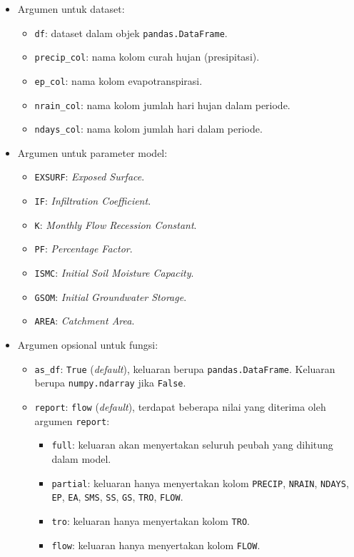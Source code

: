 \documentclass[11pt]{article}
\providecommand{\tightlist}{%
      \setlength{\itemsep}{0pt}\setlength{\parskip}{0pt}}
\begin{document}
\begin{itemize}
\tightlist
\item
  Argumen untuk dataset:

  \begin{itemize}
  \tightlist
  \item
    \texttt{df}: dataset dalam objek \texttt{pandas.DataFrame}.
  \item
    \texttt{precip\_col}: nama kolom curah hujan (presipitasi).
  \item
    \texttt{ep\_col}: nama kolom evapotranspirasi.
  \item
    \texttt{nrain\_col}: nama kolom jumlah hari hujan dalam periode.
  \item
    \texttt{ndays\_col}: nama kolom jumlah hari dalam periode.
  \end{itemize}
\item
  Argumen untuk parameter model:

  \begin{itemize}
  \tightlist
  \item
    \texttt{EXSURF}: \emph{Exposed Surface}.
  \item
    \texttt{IF}: \emph{Infiltration Coefficient}.
  \item
    \texttt{K}: \emph{Monthly Flow Recession Constant}.
  \item
    \texttt{PF}: \emph{Percentage Factor}.
  \item
    \texttt{ISMC}: \emph{Initial Soil Moisture Capacity}.
  \item
    \texttt{GSOM}: \emph{Initial Groundwater Storage}.
  \item
    \texttt{AREA}: \emph{Catchment Area}.
  \end{itemize}
\item
  Argumen opsional untuk fungsi:

  \begin{itemize}
  \tightlist
  \item
    \texttt{as\_df}: \texttt{True} (\emph{default}), keluaran berupa
    \texttt{pandas.DataFrame}. Keluaran berupa \texttt{numpy.ndarray}
    jika \texttt{False}.
  \item
    \texttt{report}: \texttt{\textquotesingle{}flow\textquotesingle{}}
    (\emph{default}), terdapat beberapa nilai yang diterima oleh argumen
    \texttt{report}:

    \begin{itemize}
    \tightlist
    \item
      \texttt{full}: keluaran akan menyertakan seluruh peubah yang
      dihitung dalam model.
    \item
      \texttt{partial}: keluaran hanya menyertakan kolom
      \texttt{PRECIP}, \texttt{NRAIN}, \texttt{NDAYS}, \texttt{EP},
      \texttt{EA}, \texttt{SMS}, \texttt{SS}, \texttt{GS}, \texttt{TRO},
      \texttt{FLOW}.
    \item
      \texttt{tro}: keluaran hanya menyertakan kolom \texttt{TRO}.
    \item
      \texttt{flow}: keluaran hanya menyertakan kolom \texttt{FLOW}.
    \end{itemize}
  \end{itemize}
\end{itemize}
\end{document}
